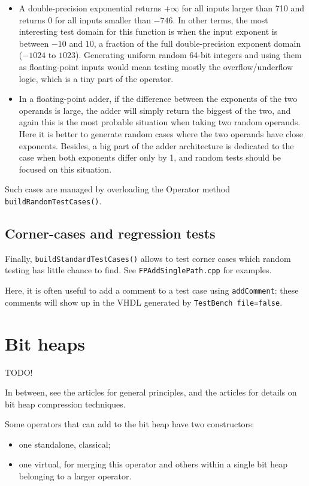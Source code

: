 \documentclass{article}
\begin{document}
\begin{itemize}\item 
  A double-precision exponential returns $+\infty$ for all inputs
  larger than 710 and returns $0$ for all inputs smaller than
  $-746$. In other terms, the most interesting test domain for this
  function is when the input exponent is between $-10$ and $10$, a
  fraction of the full double-precision exponent domain ($-1024$ to
  $1023$). Generating uniform random 64-bit integers and using them as
  floating-point inputs would mean testing mostly the
  overflow/underflow logic, which is a tiny part of the operator.


\item In a floating-point adder, if the difference between the
  exponents of the two operands is large, the adder will simply return
  the biggest of the two, and again this is the most probable
  situation when taking two random operands. Here it is better to
  generate random cases where the two operands have close
  exponents. Besides, a big part of the adder architecture is
  dedicated to the case when both exponents differ only by 1, and
  random tests should be focused on this situation.
\end{itemize}
  Such cases are managed by overloading the Operator method
  \texttt{\small buildRandomTestCases()}. 

\subsection{Corner-cases and regression tests}
Finally, \texttt{\small buildStandardTestCases()} allows to test
corner cases which random testing has little chance to find. See
\texttt{\small FPAddSinglePath.cpp} for examples. 

Here, it is often useful to add a comment to a test case using \texttt{\small addComment}: these comments
will show up in the VHDL generated by \texttt{\small TestBench file=false}.





\section{Bit heaps}
TODO!

In between, see the articles \cite{DinIstSer2013-FPL-BitHeap} for general principles, and the articles \cite{kz14a,kz14b} for details on bit heap compression techniques.

Some operators that can add to the bit heap have two constructors:
\begin{itemize}
\item one standalone, classical;
  
\item one virtual, for merging this operator and others within a single bit heap belonging to a larger operator.

\end{itemize}
\end{document}
